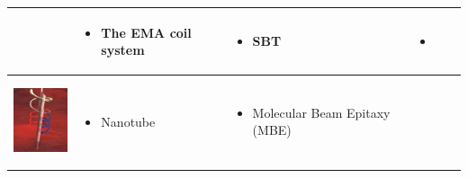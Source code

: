 \documentclass[12pt,a4paper,titlepage]{report}
\begin{document}
\begin{table}[h!]
\begin{tabular}{ c m{2.5cm}  m{4.3cm} m{3cm} m{2cm}}
\begin{minipage}[t]{3cm}
\begin{itemize}
      \end{itemize}
    \end{minipage}
    & 
    \begin{minipage}[t]{3cm}
      \begin{itemize}
        \item The EMA coil system
     
      \end{itemize}
    \end{minipage}
&
  \begin{minipage}[t]{4cm}
      \begin{itemize}
        \item SBT
	
     
      \end{itemize}
    \end{minipage}

&
	 \begin{minipage}[t]{3cm}
	   \begin{itemize}
        \item \citep{kim2013fabrication}
   
      \end{itemize}
   \end{minipage}
    \\ \hline



 \begin{minipage}{.3\textwidth}
      \includegraphics[width=\linewidth, height=25mm]{tube_ta}
    \end{minipage}
    &
    \begin{minipage}[t]{3cm}
      \begin{itemize}
        \item Nanotube
        
      \end{itemize}
    \end{minipage}
    & 
    \begin{minipage}{4cm}
      \begin{itemize}
        \item Molecular Beam Epitaxy (MBE)
	   
	   
    
      \end{itemize}
    \end{minipage}
	&


\end{tabular}
\end{table}
\end{document}
